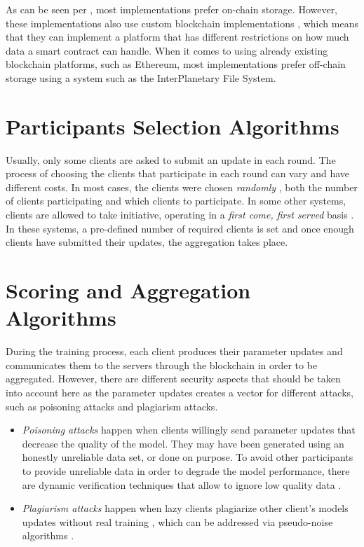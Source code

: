 As can be seen per , most implementations prefer on-chain storage. However, these implementations also use custom blockchain implementations \cite{8733825, 9524833, 8894364, 9184854, 8893114}, which means that they can implement a platform that has different restrictions on how much data a smart contract can handle. When it comes to using already existing blockchain platforms, such as Ethereum, most implementations prefer off-chain storage using a system such as the InterPlanetary File System\cite{10.48550/arxiv.2007.03856, 8945913, Peyvandi2022, 9170559, 10.1145/3319535.3363256, 10.48550/arxiv.2011.07516}.

\section{Participants Selection Algorithms}\label{related_work:participants_selection}

Usually, only some clients are asked to submit an update in each round. The process of choosing the clients that participate in each round can vary and have different costs. In most cases, the clients were chosen \textit{randomly} \cite{Peyvandi2022, demo, 9293091}, both the number of clients participating and which clients to participate. In some other systems, clients are allowed to take initiative, operating in a \textit{first come, first served} basis \cite{9184854, FANG20221}. In these systems, a pre-defined number of required clients is set and once enough clients have submitted their updates, the aggregation takes place.

\section{Scoring and Aggregation Algorithms}\label{related_work:scoring_techniques}

During the training process, each client produces their parameter updates and communicates them to the servers through the blockchain in order to be aggregated. However, there are different security aspects that should be taken into account here as the parameter updates creates a vector for different attacks, such as poisoning attacks and plagiarism attacks.

\begin{itemize}
    \item \textit{Poisoning attacks} happen when clients willingly send parameter updates that decrease the quality of the model. They may have been generated using an honestly unreliable data set, or done on purpose. To avoid other participants to provide unreliable data in order to degrade the model performance, there are dynamic verification techniques that allow to ignore low quality data \cite{10.48550/arxiv.2110.02182, 10.48550/arxiv.2104.10501}.
    
    \item \textit{Plagiarism attacks} happen when lazy clients plagiarize other client's models updates without real training \cite{9403374}, which can be addressed via pseudo-noise algorithms \cite{10.48550/arxiv.2009.09338}.
\end{itemize}

